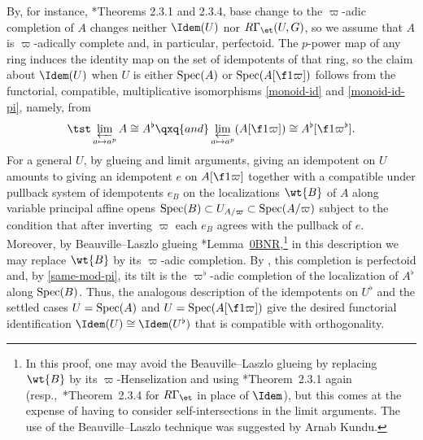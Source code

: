 By, for instance, \cite{BC19}*{Theorems 2.3.1 and 2.3.4}, base change to the $\varpi$-adic completion of $A$ changes neither $\Idem(U)$ nor $R\Gamma_\et(U, G)$, so we assume that $A$ is $\varpi$-adically complete and, in particular, perfectoid. The $p$-power map of any ring induces the identity map on the set of idempotents of that ring, so the claim about $\Idem(U)$ when $U$ is either $\operatorname{Spec}(A)$ or $\Spec(A[\f 1\varpi])$ follows from the functorial, compatible, multiplicative isomorphisms \eqref{monoid-id} and \eqref{monoid-id-pi}, namely, from
\[
\tst \varprojlim_{a \mapsto a^p} A \cong A^\flat \qxq{and} \varprojlim_{a \mapsto a^p} (A[\f 1\varpi]) \cong A^\flat[\f 1 {\varpi^\flat}].
\]
For a general $U$, by glueing and limit arguments, giving an idempotent on $U$ amounts to giving an idempotent $e$ on $A[\f 1\varpi]$ together with a compatible under pullback system of idempotents $e_B$ on the localizations $\wt{B}$ of $A$ along variable principal affine opens $\operatorname{Spec}(B) \subset U_{A/\varpi} \subset \operatorname{Spec}(A/\varpi)$ subject to the condition that after inverting $\varpi$ each $e_B$ agrees with the pullback of $e$. Moreover, by Beauville--Laszlo glueing \cite{SP}*{Lemma~\href{https://stacks.math.columbia.edu/tag/0BNR}{0BNR}},\footnote{In this proof, one may avoid the Beauville--Laszlo glueing by replacing $\wt{B}$ by its $\varpi$-Henselization and using \cite{BC19}*{Theorem~2.3.1} again (resp.,~\cite{BC19}*{Theorem~2.3.4} for $R\Gamma_\et$ in place of $\Idem$), but this comes at the expense of having to consider self-intersections in the limit arguments. The use of the Beauville--Laszlo technique was suggested by Arnab Kundu.} in this description we may replace $\wt{B}$ by its $\varpi$-adic completion. By , this completion is perfectoid and, by \eqref{same-mod-pi}, its tilt is the $\varpi^\flat$-adic completion of %
the localization of $A^\flat$ along $\operatorname{Spec}(B)$. Thus, the analogous description of the idempotents on $U^\flat$ and the settled cases $U = \operatorname{Spec}(A)$ and $U = \Spec(A[\f 1\varpi])$ %
give the desired functorial identification $\Idem(U) \cong \Idem(U^\flat)$ that is compatible with orthogonality.

